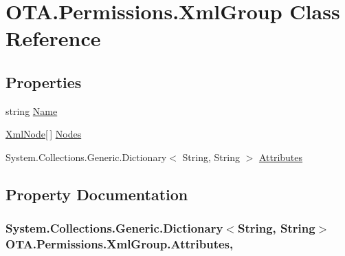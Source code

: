 \hypertarget{class_o_t_a_1_1_permissions_1_1_xml_group}{}\section{O\+T\+A.\+Permissions.\+Xml\+Group Class Reference}
\label{class_o_t_a_1_1_permissions_1_1_xml_group}
\subsection*{Properties}
\begin{DoxyCompactItemize}
\item 
string \hyperlink{class_o_t_a_1_1_permissions_1_1_xml_group_a052d5af412a022846cca6391be50aa74}{Name}
\item 
\hyperlink{class_o_t_a_1_1_permissions_1_1_xml_node}{Xml\+Node}\mbox{[}$\,$\mbox{]} \hyperlink{class_o_t_a_1_1_permissions_1_1_xml_group_ad9a679412d2984d468e6ef9178e9e43d}{Nodes}
\item 
System.\+Collections.\+Generic.\+Dictionary$<$ String, String $>$ \hyperlink{class_o_t_a_1_1_permissions_1_1_xml_group_add169f7314a5aa49986173dc7bf59313}{Attributes}
\end{DoxyCompactItemize}


\subsection{Property Documentation}
\hypertarget{class_o_t_a_1_1_permissions_1_1_xml_group_add169f7314a5aa49986173dc7bf59313}{}
\subsubsection[{Attributes}]{\setlength{\rightskip}{0pt plus 5cm}System.\+Collections.\+Generic.\+Dictionary$<$String, String$>$ O\+T\+A.\+Permissions.\+Xml\+Group.\+Attributes\hspace{0.3cm}{\ttfamily [get]}, {\ttfamily [set]}}\label{class_o_t_a_1_1_permissions_1_1_xml_group_add169f7314a5aa49986173dc7bf59313}
\hypertarget{class_o_t_a_1_1_permissions_1_1_xml_group_a052d5af412a022846cca6391be50aa74}{}
